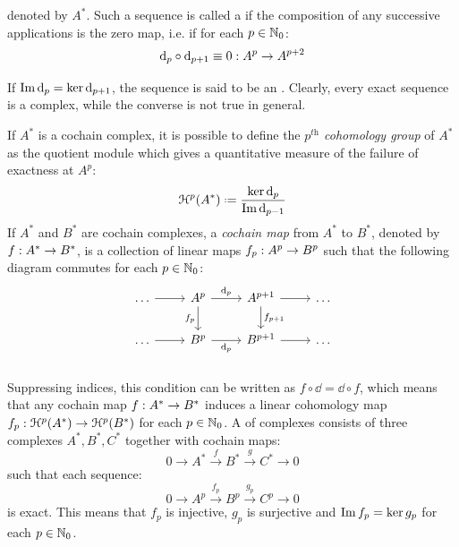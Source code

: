 denoted by $ A^* $. Such a sequence is called a \footnotemark if the composition of any successive applications is the zero map, i.e. if for each $ p \in \mathbb{N}_0 $:
\begin{equation}
  \mathrm{d}_p \circ \mathrm{d}_{p+1} \equiv 0 : A^p \rightarrow A^{p+2}
\end{equation}


If $ \operatorname{Im} \mathrm{d}_p = \ker \mathrm{d}_{p+1} $, the sequence is said to be an . Clearly, every exact sequence is a complex, while the converse is not true in general.

If $ A^* $ is a cochain complex, it is possible to define the \emph{$ p^\textit{th} $ cohomology group} of $ A^* $ as the quotient module which gives a quantitative measure of the failure of exactness at $ A^p $:
\begin{equation}
  \hp{p}(A^*) \defeq \frac{\ker \dd_p}{\im \dd_{p-1}}
\end{equation}
If $ A^* $ and $ B^* $ are cochain complexes, a \emph{cochain map} from $ A^* $ to $ B^* $, denoted by $ f : A^* \rightarrow B^* $, is a collection of linear maps $ f_p : A^p \rightarrow B^p $ such that the following diagram commutes for each $ p \in \mathbb{N}_0 $:
\begin{equation*}
  \begin{tikzcd}
    \dots \ar[r] & A^p \ar[r , "\dd_p"] \ar[d , "f_p" , swap] & A^{p+1} \ar[d , "f_{p+1}"] \ar[r] & \dots \\
    \dots \ar[r] & B^p \ar[r , "\dd_p" , swap] & B^{p+1} \ar[r] & \dots \\
  \end{tikzcd}
\end{equation*}
Suppressing indices, this condition can be written as $ f \circ \dd = \dd \circ f $, which means that any cochain map $ f : A^* \rightarrow B^* $ induces a linear cohomology map $ f_p : \EuScript{H}^{p}(A^*) \rightarrow \EuScript{H}^{p}(B^*) $ for each $ p \in \mathbb{N}_0 $. A  of complexes consists of three complexes $ A^* , B^* , C^* $ together with cochain maps:
\begin{equation}
  0 \longrightarrow A^* \xrightarrow{\ f \ } B^* \xrightarrow{\ g \ } C^* \longrightarrow 0
  \label{eq:short-exact-sequence}
\end{equation}
such that each sequence:
\begin{equation*}
  0 \longrightarrow A^p \xrightarrow{\ f_p \ } B^p \xrightarrow{\ g_p \ } C^p \longrightarrow 0
\end{equation*}
is exact. This means that $ f_p $ is injective, $ g_p $ is surjective and $ \operatorname{Im} f_p = \ker g_p $ for each $ p \in \mathbb{N}_0 $.


